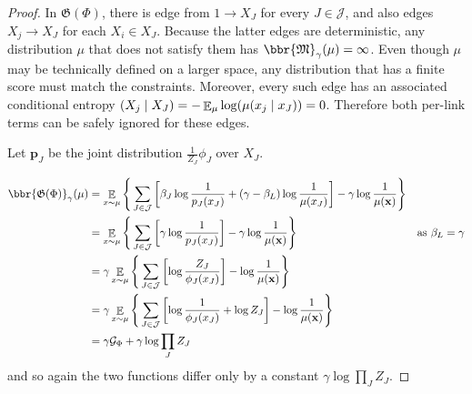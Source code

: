 \documentclass{article}
\theoremstyle{plain}
\theoremstyle{definition}
\theoremstyle{remark}
\let\H\relax
\DeclareMathOperator{\H}{\mathrm{H}} %
\DeclareMathOperator*{\E}{\mathbb{E}} %
\newcommand\mat[1]{\mathbf{#1}}
\newcommand{\dg}[1]{\mathfrak{#1}}
\newcommand{\PDGof}[1]{\dg G(#1)}
\numberwithin{equation}{section}
\begin{document}
	\begin{proof}
		In $\PDGof{\Phi}$, there is edge from $1 \to X_J$ for every $J \in \mathcal J$, and also edges $X_j \to X_J$ for each $X_i \in X_J$. Because the latter edges are deterministic, any distribution $\mu$ that does not satisfy them has $\bbr{\dg M}_\gamma(\mu) = \infty$. Even though $\mu$ may be technically defined on a larger space, any distribution that has a finite score must match the constraints. Moreover, every such edge has an associated conditional entropy $\H(X_j \mid X_J) = -\E_\mu\log(\mu(x_j \mid x_J)) = 0$. Therefore both per-link terms can be safely ignored for these edges.

		Let $\mat p_J$ be the joint distribution $\frac{1}{Z_J}\phi_J$ over $X_J$.

		\begin{align*}
		\bbr{\PDGof{\Phi}}_\gamma(\mu) &= \E_{ x \sim \mu} \Bigg\{   \sum_{ J \in \mathcal J } \left[
			\beta_J \log \frac{1}{ p_J(x_J) } + (\gamma - \beta_L ) \log \frac{1}{\mu(x_J)} \right] - \gamma \log \frac{1}{\mu(\mat x)} \Bigg\} \\
			&= \E_{ x \sim \mu} \Bigg\{  \sum_{ J \in \mathcal J }\left[
				\gamma \log \frac{1}{p_J(x_J)}  \right] - \gamma \log \frac{1}{\mu(\mat x)} \Bigg\} 
					&\text{as $\beta_L = \gamma$}\\
			&= \gamma \E_{x \sim \mu} \Bigg\{  \sum_{ J \in \mathcal J } \left[
				\log \frac{Z_J}{\phi_J(x_J)}  \right] -\log \frac{1}{\mu(\mat x)} \Bigg\} \\
			&= \gamma \E_{x \sim \mu} \Bigg\{  \sum_{ J \in \mathcal J } \left[
				\log \frac{1}{\phi_J(x_J)} + \log Z_J \right]  - \log \frac{1}{\mu(\mat x)} \Bigg\} \\
			&= \gamma \mathcal G_{\Phi} + \gamma \log \prod_{J} Z_J
		\end{align*}
		and so again the two functions differ only by a constant $\gamma \log \prod_{J} Z_J$.
	\end{proof}
\end{document}
